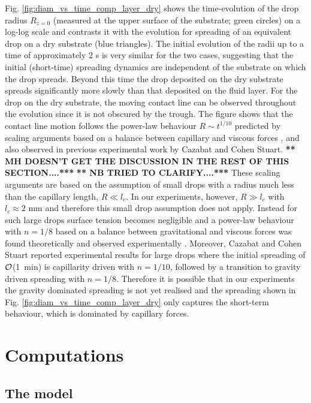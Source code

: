 \documentclass[aip,graphicx]{revtex4-1}
\begin{document}
Fig. \ref{fig:diam_vs_time_comp_layer_dry} shows the time-evolution
of the drop radius $R_{z=0}$ (measured at the upper surface
of the substrate; green circles) on a log-log scale and
contrasts it with the evolution for spreading of an equivalent drop 
on a dry substrate (blue triangles). The initial evolution 
of the radii up to a time of approximately 2 s is very similar for the two 
cases, suggesting that the initial (short-time) spreading dynamics are
independent of the substrate on which the drop spreads.
Beyond this time the drop deposited on the dry substrate spreads
significantly more slowly than that deposited on the fluid layer.
For the drop on the dry substrate, the moving contact line can be
observed throughout the evolution since it is not obscured by the
trough. The figure shows that the contact line motion follows
the power-law behaviour $R \sim t^{1/10}$ predicted by scaling
arguments based on a balance between capillary and viscous forces
\cite{tanner1979spreading}, and also observed in previous experimental
work by Cazabat and Cohen Stuart\cite{cazabat1986dynamics}.
{\bf *** MH DOESN'T GET THE DISCUSSION IN THE REST OF THIS SECTION....***}
{\bf *** NB TRIED TO CLARIFY....***}
These scaling arguments are based
on the assumption of small drops with a radius much less
than the capillary length, $R \ll l_c$.
In our experiments, however, $R \gg l_c$ with $l_c \approx 2$ mm and
therefore this small drop assumption does not apply.
Instead for such large drops surface tension becomes negligible and a power-law behaviour with $n=1/8$ based on a
balance between gravitational and viscous forces was found
theoretically \cite{lopez1976spreading} and observed experimentally
\cite{cazabat1986dynamics,huppert1982propagation}.
Moreover, Cazabat and
Cohen Stuart\cite{cazabat1986dynamics} reported experimental results
for large drops
where the initial spreading of ${\cal O}$(1~min) is capillarity driven with
$n=1/10$, followed by a transition to 
gravity driven spreading with $n=1/8$.
Therefore it is possible that in our experiments the gravity dominated spreading is not yet
realised and the spreading shown in Fig.
\ref{fig:diam_vs_time_comp_layer_dry} only captures the short-term
behaviour, which is dominated by capillary forces.


\section{Computations}

\subsection{The model}
\end{document}
